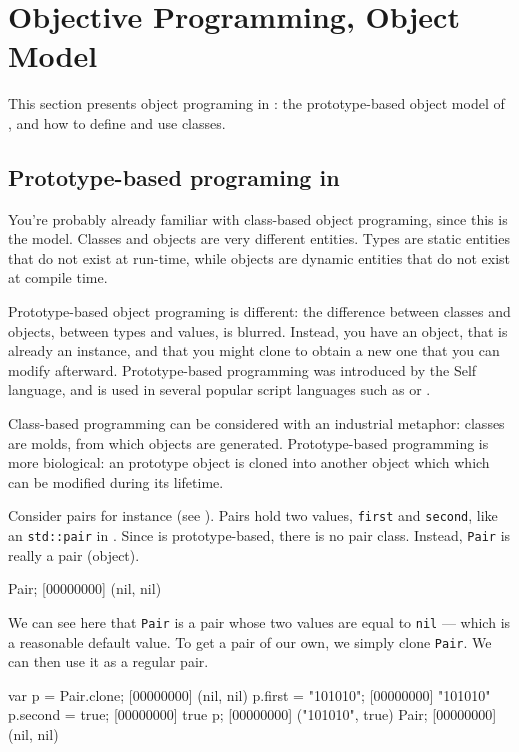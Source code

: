 \chapter{Objective Programming, \us Object Model}
\label{sec:tut:object}

This section presents object programing in \us: the prototype-based
object model of \us, and how to define and use classes.

\section{Prototype-based programing in \us}

You're probably already familiar with class-based object programing,
since this is the \Cxx model.  Classes and objects are very different
entities.  Types are static entities that do not exist at run-time,
while objects are dynamic entities that do not exist at compile time.

Prototype-based object programing is different: the difference between
classes and objects, between types and values, is blurred. Instead,
you have an
object, that is already an instance, and that you might clone to
obtain a new one that you can modify afterward. Prototype-based
programming was introduced by the Self language, and is used in
several popular script languages such as \io or \js.

Class-based programming can be considered with an industrial
metaphor: classes are molds, from which objects are generated.
Prototype-based programming is more biological: an prototype object is
cloned into another object which which can be modified during its
lifetime.

Consider pairs for instance (see ). Pairs hold two
values, \lstinline|first| and \lstinline|second|, like an
\lstinline{std::pair} in \Cxx. Since \us is prototype-based, there is
no pair class. Instead, \lstinline|Pair| is really a pair (object).

\begin{urbiscript}[firstnumber=1]
Pair;
[00000000] (nil, nil)
\end{urbiscript}

We can see here that \lstinline|Pair| is a pair whose two values are
equal to \lstinline|nil| --- which is a reasonable default value. To
get a pair of our own, we simply clone \lstinline|Pair|.  We can then
use it as a regular pair.

\begin{urbiscript}
var p = Pair.clone;
[00000000] (nil, nil)
p.first = "101010";
[00000000] "101010"
p.second = true;
[00000000] true
p;
[00000000] ("101010", true)
Pair;
[00000000] (nil, nil)
\end{urbiscript}

